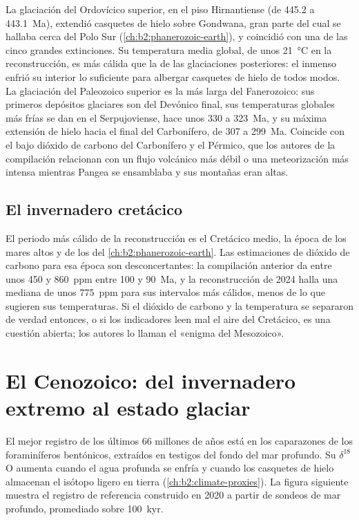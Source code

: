 La glaciación del Ordovícico superior, en el piso Hirnantiense (de 445.2 a \qty{443.1}{Ma}), extendió casquetes de hielo
sobre Gondwana, gran parte del cual se hallaba cerca del Polo Sur (\cref{ch:b2:phanerozoic-earth}), y
coincidió con una de las cinco grandes extinciones. Su temperatura media global, de unos
\qty{21}{\celsius} en la reconstrucción, es más cálida que la de las glaciaciones posteriores: el inmenso
 enfrió su interior lo suficiente para albergar casquetes de hielo de todos modos. La glaciación del Paleozoico superior es
la más larga del Fanerozoico: sus primeros depósitos glaciares son del Devónico final, sus temperaturas globales más
frías se dan en el Serpujoviense, hace unos 330 a \qty{323}{Ma}, y su máxima extensión
de hielo hacia el final del Carbonífero, de 307 a \qty{299}{Ma}. Coincide con el bajo dióxido
de carbono del Carbonífero y el Pérmico, que los autores de la compilación relacionan con un flujo volcánico más débil
o una meteorización más intensa mientras Pangea se ensamblaba y sus montañas eran altas.

\subsection*{El invernadero cretácico}

El periodo más cálido de la reconstrucción es el Cretácico medio, la época de los mares altos y de los
 del \cref{ch:b2:phanerozoic-earth}. Las estimaciones de dióxido de carbono para
esa época son desconcertantes: la compilación anterior da entre unos 450 y \qty{860}{ppm} entre 100 y
\qty{90}{Ma}, y la reconstrucción de 2024 halla una mediana de unos \qty{775}{ppm} para sus intervalos
más cálidos, menos de lo que sugieren sus temperaturas. Si el dióxido de carbono y la temperatura se separaron de verdad
entonces, o si los indicadores leen mal el aire del Cretácico, es una cuestión abierta; los autores lo llaman el «enigma
del Mesozoico».

\section{El Cenozoico: del invernadero extremo al estado glaciar}\label{sec:b2:deep-time-climate:cenozoic}

El mejor registro de los últimos 66 millones de años está en los caparazones de los foraminíferos bentónicos, extraídos en testigos
del fondo del mar profundo. Su $\delta^{18}$O aumenta cuando el agua profunda se enfría y cuando los casquetes de hielo almacenan
el isótopo ligero en tierra (\cref{ch:b2:climate-proxies}). La figura siguiente muestra el registro de
referencia construido en 2020 a partir de sondeos de mar profundo, promediado sobre \qty{100}{kyr}.

